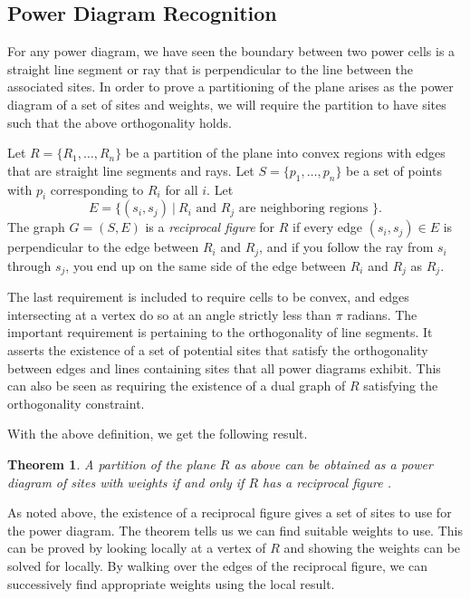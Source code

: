 \documentclass[a4paper, 11pt]{article}
\newtheorem{theorem}{Theorem}[section]
\begin{document}
\subsection{Power Diagram Recognition}

For any power diagram, we have seen the boundary between two power cells is a straight line segment or ray that is perpendicular to the line between
the associated sites. In order to prove a partitioning of the plane arises as the power diagram of a set of sites and weights, we will require the
partition to have sites such that the above orthogonality holds.

Let $R = \{ R_1,\dots, R_n \}$ be a partition of the plane into convex regions with edges that are straight line segments and rays. Let $S = \{ p_1,
\dots, p_n \}$ be a set of points with $p_i$ corresponding to $R_i$ for all $i$. Let
\[ E = \{ (s_i, s_j) \ | \ R_i \text{ and } R_j \text{ are neighboring regions } \} . \]
The graph $G = (S,E)$ is a \textit{reciprocal figure} for $R$ if every edge $(s_i, s_j) \in E$ is perpendicular to the edge between $R_i$ and $R_j$,
and if you follow the ray from $s_i$ through $s_j$, you end up on the same side of the edge between $R_i$ and $R_j$ as $R_j$.

The last requirement is included to require cells to be convex, and edges intersecting at a vertex do so at an angle strictly less than $\pi$ radians.
The important requirement is pertaining to the orthogonality of line segments. It asserts the existence of a set of potential sites that satisfy the
orthogonality between edges and lines containing sites that all power diagrams exhibit. This can also be seen as requiring the existence of a dual
graph of $R$ satisfying the orthogonality constraint.

With the above definition, we get the following result.

\begin{theorem}
  A partition of the plane $R$ as above can be obtained as a power diagram of sites with weights if and only if $R$ has a reciprocal figure
  \cite{ash-bolker}.
  \label{thm:pow_rec}
\end{theorem}

As noted above, the existence of a reciprocal figure gives a set of sites to use for the power diagram. The theorem tells us we can find suitable
weights to use. This can be proved by looking locally at a vertex of $R$ and showing the weights can be solved for locally. By walking over the edges
of the reciprocal figure, we can successively find appropriate weights using the local result.
\end{document}
